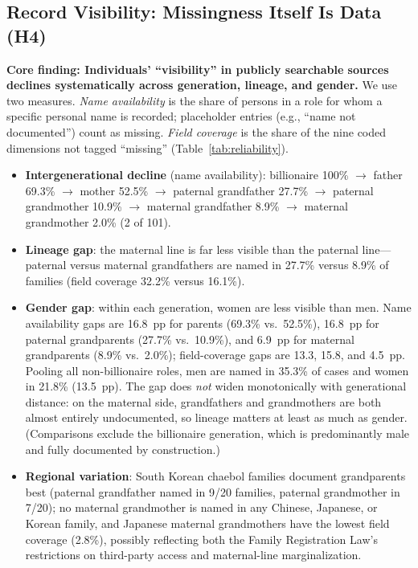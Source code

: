 \documentclass[11pt,a4paper]{article}
\begin{document}
\subsection{Record Visibility: Missingness Itself Is Data (H4)}

\textbf{Core finding: Individuals' ``visibility'' in publicly searchable sources declines systematically across generation, lineage, and gender.} We use two measures. \emph{Name availability} is the share of persons in a role for whom a specific personal name is recorded; placeholder entries (e.g., ``name not documented'') count as missing. \emph{Field coverage} is the share of the nine coded dimensions not tagged ``missing'' (Table~\ref{tab:reliability}).

\begin{itemize}
\item \textbf{Intergenerational decline} (name availability): billionaire 100\% $\rightarrow$ father 69.3\% $\rightarrow$ mother 52.5\% $\rightarrow$ paternal grandfather 27.7\% $\rightarrow$ paternal grandmother 10.9\% $\rightarrow$ maternal grandfather 8.9\% $\rightarrow$ maternal grandmother 2.0\% (2 of 101).
\item \textbf{Lineage gap}: the maternal line is far less visible than the paternal line---paternal versus maternal grandfathers are named in 27.7\% versus 8.9\% of families (field coverage 32.2\% versus 16.1\%).
\item \textbf{Gender gap}: within each generation, women are less visible than men. Name availability gaps are 16.8~pp for parents (69.3\% vs.\ 52.5\%), 16.8~pp for paternal grandparents (27.7\% vs.\ 10.9\%), and 6.9~pp for maternal grandparents (8.9\% vs.\ 2.0\%); field-coverage gaps are 13.3, 15.8, and 4.5~pp. Pooling all non-billionaire roles, men are named in 35.3\% of cases and women in 21.8\% (13.5~pp). The gap does \emph{not} widen monotonically with generational distance: on the maternal side, grandfathers and grandmothers are both almost entirely undocumented, so lineage matters at least as much as gender. (Comparisons exclude the billionaire generation, which is predominantly male and fully documented by construction.)
\item \textbf{Regional variation}: South Korean chaebol families document grandparents best (paternal grandfather named in 9/20 families, paternal grandmother in 7/20); no maternal grandmother is named in any Chinese, Japanese, or Korean family, and Japanese maternal grandmothers have the lowest field coverage (2.8\%), possibly reflecting both the Family Registration Law's restrictions on third-party access and maternal-line marginalization.
\end{itemize}
\end{document}
